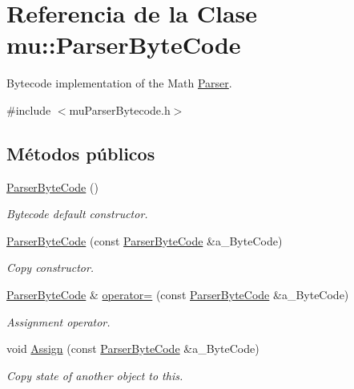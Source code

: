 \hypertarget{classmu_1_1_parser_byte_code}{}\section{Referencia de la Clase mu\+:\+:Parser\+Byte\+Code}
\label{classmu_1_1_parser_byte_code}


Bytecode implementation of the Math \hyperlink{classmu_1_1_parser}{Parser}.  




{\ttfamily \#include $<$mu\+Parser\+Bytecode.\+h$>$}

\subsection*{Métodos públicos}
\begin{DoxyCompactItemize}
\item 
\hyperlink{classmu_1_1_parser_byte_code_a9b03ff607c429dcad0a4d01eb155cb55}{Parser\+Byte\+Code} ()
\begin{DoxyCompactList}\small\item\em Bytecode default constructor. \end{DoxyCompactList}\item 
\hyperlink{classmu_1_1_parser_byte_code_ac95bc49b5a31cfe2647f2bfc8b05b4c9}{Parser\+Byte\+Code} (const \hyperlink{classmu_1_1_parser_byte_code}{Parser\+Byte\+Code} \&a\+\_\+\+Byte\+Code)
\begin{DoxyCompactList}\small\item\em Copy constructor. \end{DoxyCompactList}\item 
\hyperlink{classmu_1_1_parser_byte_code}{Parser\+Byte\+Code} \& \hyperlink{classmu_1_1_parser_byte_code_a10f20b14b190f65fbf854761308fabae}{operator=} (const \hyperlink{classmu_1_1_parser_byte_code}{Parser\+Byte\+Code} \&a\+\_\+\+Byte\+Code)
\begin{DoxyCompactList}\small\item\em Assignment operator. \end{DoxyCompactList}\item 
void \hyperlink{classmu_1_1_parser_byte_code_a8331da2289733a302233439e48e59bc7}{Assign} (const \hyperlink{classmu_1_1_parser_byte_code}{Parser\+Byte\+Code} \&a\+\_\+\+Byte\+Code)
\begin{DoxyCompactList}\small\item\em Copy state of another object to this. \end{DoxyCompactList}\item 

\end{DoxyCompactItemize}

